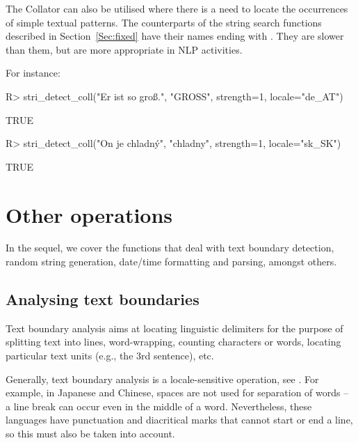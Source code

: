 \documentclass[nojss]{jss}
\begin{document}
The  Collator can also be utilised
where there is a need to locate the occurrences of simple textual patterns.
The counterparts of the string search functions
described in Section~\ref{Sec:fixed}
have their names ending with .
They are slower than them, but are more appropriate in NLP activities.

For instance:

\begin{Schunk}
\begin{Sinput}
R> stri_detect_coll("Er ist so groß.", "GROSS", strength=1, locale="de_AT")
\end{Sinput}
\begin{Soutput}
[1] TRUE
\end{Soutput}
\begin{Sinput}
R> stri_detect_coll("On je chladný", "chladny", strength=1, locale="sk_SK")
\end{Sinput}
\begin{Soutput}
[1] TRUE
\end{Soutput}
\end{Schunk}





\section{Other operations}\label{Sec:other}

In the sequel, we cover the functions that deal with
text boundary detection, random string generation,
date/time formatting and parsing, amongst others.


\subsection{Analysing text boundaries}\label{Sec:BoundaryAnalysis}

Text boundary analysis aims at locating linguistic delimiters
for the purpose of splitting text into lines,
word-wrapping, counting characters or
words, locating particular text units (e.g.,
the 3rd sentence), etc.

Generally, text boundary analysis is a locale-sensitive operation,
see \citep{usa29:segmentation}.
For example, in Japanese and Chinese, spaces are not used for
separation of words  --
a line break can occur even in the middle of a word. Nevertheless,
these languages have punctuation and diacritical marks that cannot
start or end a line, so this must also be taken into account.
\end{document}
